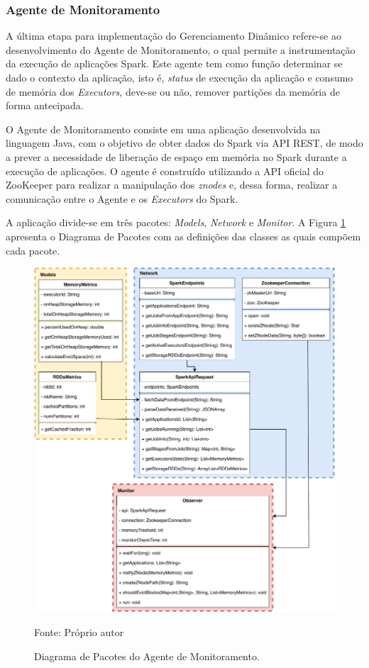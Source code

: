 \subsubsection{Agente de Monitoramento}
A última etapa para implementação do Gerenciamento Dinâmico refere-se ao desenvolvimento do Agente de Monitoramento, o qual permite a instrumentação da execução de aplicações Spark. Este agente tem como função determinar se dado o contexto da aplicação, isto é, \textit{status} de execução da aplicação e consumo de memória dos \textit{Executors}, deve-se ou não, remover partições da memória de forma antecipada.  

O Agente de Monitoramento consiste em uma aplicação desenvolvida na linguagem Java, com o objetivo de obter dados do Spark via API REST, de modo a prever a necessidade de liberação de espaço em memória no Spark durante a execução de aplicações. O agente é construído utilizando a API oficial do ZooKeeper para realizar a manipulação dos \textit{znodes} e, dessa forma, realizar a comunicação entre o Agente e os \textit{Executors} do Spark. 

A aplicação divide-se em três pacotes: \textit{Models}, \textit{Network} e \textit{Monitor}. A Figura \ref{fig:diagrama-pacotes} apresenta o Diagrama de Pacotes com as definições das classes as quais compõem cada pacote.

\begin{figure}[!ht]
    \caption{Diagrama de Pacotes do Agente de Monitoramento.}
    \begin{center}
        \includegraphics[scale=0.78]{imagens/diagrama-classe-v2.pdf}
    \end{center}
    \small{Fonte: Próprio autor}
    \label{fig:diagrama-pacotes}
\end{figure}

